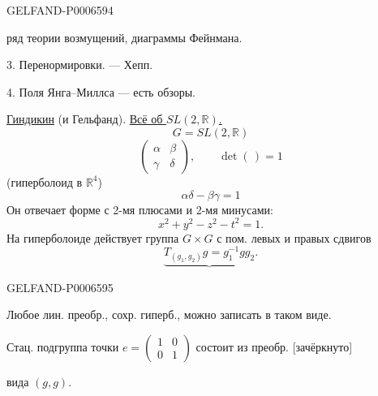 \begin{GelfandAdjacentEvidence}{GELFAND-P000659}{4}

ряд теории возмущений, диаграммы Фейнмана.

3. Перенормировки. --- Хепп.

4. Поля Янга--Миллса --- есть обзоры.

\underline{Гиндикин} (и Гельфанд).
\underline{Всё об \(SL(2,\mathbb R)\).}
\[
G=SL(2,\mathbb R)
\]
\[
\begin{pmatrix}\alpha&\beta\\\gamma&\delta\end{pmatrix},
\qquad \det(\,)=1
\]
(гиперболоид в \(\mathbb R^4\))
\[
\alpha\delta-\beta\gamma=1
\]
Он отвечает форме с 2-мя плюсами и 2-мя минусами:
\[
x^2+y^2-z^2-t^2=1.
\]
На гиперболоиде действует группа \(G\times G\) с пом. левых и правых сдвигов
\[
\underbrace{T_{(g_1,g_2)}g=g_1^{-1}gg_2}.
\]
\end{GelfandAdjacentEvidence}
\begin{GelfandAdjacentEvidence}{GELFAND-P000659}{5}


Любое лин. преобр., сохр. гиперб., можно записать в таком виде.

Стац. подгруппа точки \(e=\begin{pmatrix}1&0\\0&1\end{pmatrix}\)
состоит из преобр. [зачёркнуто]
\end{GelfandAdjacentEvidence}

вида \((g,g)\).


